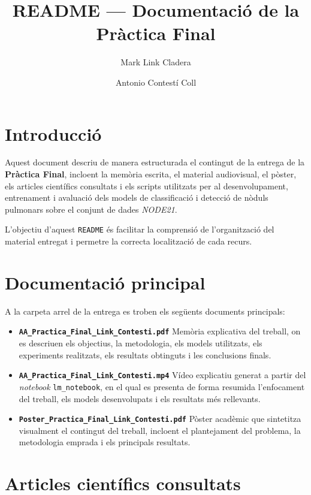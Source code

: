 \documentclass[11pt,a4paper]{article}
\title{\textbf{README — Documentació de la Pràctica Final}}
\author{Mark Link Cladera \and Antonio Contestí Coll}
\date{}
\begin{document}
\maketitle

\section{Introducció}

Aquest document descriu de manera estructurada el contingut de la entrega de la
\textbf{Pràctica Final}, incloent la memòria escrita, el material audiovisual,
el pòster, els articles científics consultats i els scripts utilitzats per al
desenvolupament, entrenament i avaluació dels models de classificació i detecció
de nòduls pulmonars sobre el conjunt de dades \textit{NODE21}.

L’objectiu d’aquest \texttt{README} és facilitar la comprensió de l’organització
del material entregat i permetre la correcta localització de cada recurs.

\section{Documentació principal}

A la carpeta arrel de la entrega es troben els següents documents principals:

\begin{itemize}[leftmargin=1.5cm]
    \item \textbf{\texttt{AA\_Practica\_Final\_Link\_Contesti.pdf}}  
    Memòria explicativa del treball, on es descriuen els objectius, la metodologia,
    els models utilitzats, els experiments realitzats, els resultats obtinguts i
    les conclusions finals.

    \item \textbf{\texttt{AA\_Practica\_Final\_Link\_Contesti.mp4}}  
    Vídeo explicatiu generat a partir del \textit{notebook} \texttt{lm\_notebook},
    en el qual es presenta de forma resumida l’enfocament del treball, els models
    desenvolupats i els resultats més rellevants.

    \item \textbf{\texttt{Poster\_Practica\_Final\_Link\_Contesti.pdf}}  
    Pòster acadèmic que sintetitza visualment el contingut del treball, incloent
    el plantejament del problema, la metodologia emprada i els principals resultats.
\end{itemize}

\section{Articles científics consultats}
\end{document}
